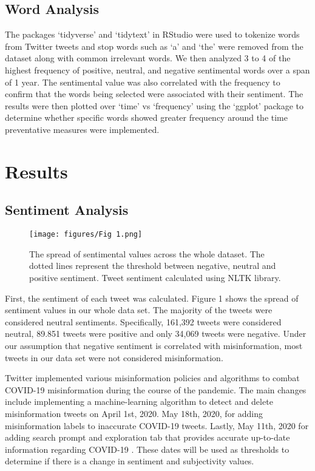\documentclass[10pt,twocolumn,letterpaper]{article}
\begin{document}
\subsection{Word Analysis}
The packages ‘tidyverse’ and ‘tidytext’ in RStudio were used to tokenize words from Twitter tweets and stop words such as ‘a’ and ‘the’ were removed from the dataset along with common irrelevant words. We then analyzed 3 to 4 of the highest frequency of positive, neutral, and negative sentimental words over a span of 1 year. The sentimental value was also correlated with the frequency to confirm that the words being selected were associated with their sentiment. The results were then plotted over ‘time’ vs ‘frequency’ using the ‘ggplot’ package to determine whether specific words showed greater frequency around the time preventative measures were implemented. 


\section{Results}

\subsection{Sentiment Analysis}

\begin{figure}[H]
  \centering
  \texttt{[image: figures/Fig 1.png]}
  \caption{The spread of sentimental values across the whole dataset. The dotted lines represent the threshold between negative, neutral and positive sentiment. Tweet sentiment calculated using NLTK library.}
\end{figure}
First, the sentiment of each tweet was calculated. Figure 1 shows the spread of sentiment values in our whole data set. The majority of the tweets were considered neutral sentiments. Specifically, 161,392 tweets were considered neutral, 89.851 tweets were positive and only 34,069 tweets were negative. Under our assumption that negative sentiment is correlated with misinformation, most tweets in our data set were not considered misinformation. 

Twitter implemented various misinformation policies and algorithms to combat COVID-19 misinformation during the course of the pandemic. The main changes include implementing a machine-learning algorithm to detect and delete misinformation tweets on April 1st, 2020. May 18th, 2020, for adding misinformation labels to inaccurate COVID-19 tweets. Lastly, May 11th, 2020 for adding search prompt and exploration tab that provides accurate up-to-date information regarding COVID-19 \cite{inc._2021}. These dates will be used as thresholds to determine if there is a change in sentiment and subjectivity values. 
\end{document}
